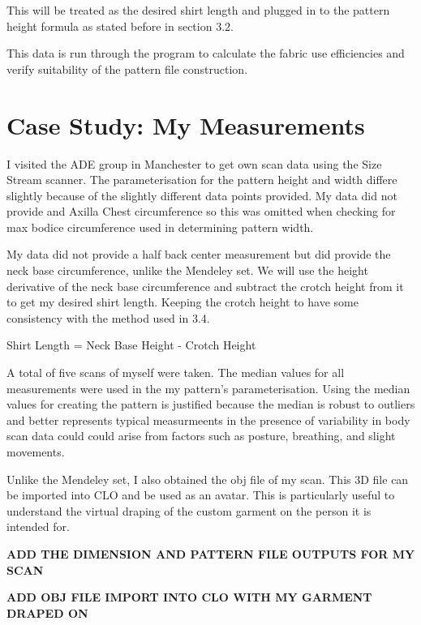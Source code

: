 This will be treated as the desired shirt length and plugged in to the pattern height formula as stated before in section 3.2. 

This data is run through the program to calculate the fabric use efficiencies and verify suitability of the pattern file construction.
\section{Case Study: My Measurements}
I visited the ADE group in Manchester to get own scan data using the Size Stream scanner. The parameterisation for the pattern height and width differe slightly because of the slightly different data points provided. 
My data did not provide and Axilla Chest circumference so this was omitted when checking for max bodice circumference used in determining pattern width.

My data did not provide a half back center measurement but did provide the neck base circumference, unlike the Mendeley set. We will use the height derivative of the neck base circumference and subtract the crotch height from it to get my desired shirt length. Keeping the crotch height to have some consistency with the method used in 3.4.

Shirt Length = Neck Base Height - Crotch Height

A total of five scans of myself were taken. The median values for all measurements were used in the my pattern's parameterisation. Using the median values for creating the pattern is justified because the median is robust to outliers and better represents typical measurmeents in the presence of variability in body scan data could could arise from factors such as posture, breathing, and slight movements.

Unlike the Mendeley set, I also obtained the obj file of my scan. This 3D file can be imported into CLO and be used as an avatar. This is particularly useful to understand the virtual draping of the custom garment on the person it is intended for.

\textbf{ADD THE DIMENSION AND PATTERN FILE OUTPUTS FOR MY SCAN}

\textbf{ADD OBJ FILE IMPORT INTO CLO WITH MY GARMENT DRAPED ON}